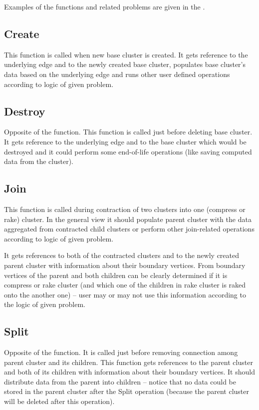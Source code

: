 Examples of the functions and related problems are given in the .

\subsection{\sc Create}

This function is called when new base cluster is created. It gets reference to
the underlying edge and to the newly created base cluster, populates base
cluster's data based on the underlying edge and runs other user defined
operations according to logic of given problem.

\subsection{\sc Destroy}

Opposite of the \Create{} function. This function is called just before deleting
base cluster. It gets reference to the underlying edge and to the base cluster
which would be destroyed and it could perform some end-of-life operations (like
saving computed data from the cluster).

\subsection{\sc Join}

This function is called during contraction of two clusters into one (compress or
rake) cluster. In the general view it should populate parent cluster with the
data aggregated from contracted child clusters or perform other join-related
operations according to logic of given problem.

It gets references to both of the contracted clusters and to the newly created
parent cluster with information about their boundary vertices. From boundary
vertices of the parent and both children can be clearly determined if it is
compress or rake cluster (and which one of the children in rake cluster is raked
onto the another one) -- user may or may not use this information according to
the logic of given problem.

\subsection{\sc Split}

Opposite of the \Join{} function. It is called just before removing connection
among parent cluster and its children. This function gets references to the
parent cluster and both of its children with information about their boundary
vertices. It should distribute data from the parent into children -- notice that
no data could be stored in the parent cluster after the Split operation (because
the parent cluster will be deleted after this operation).

